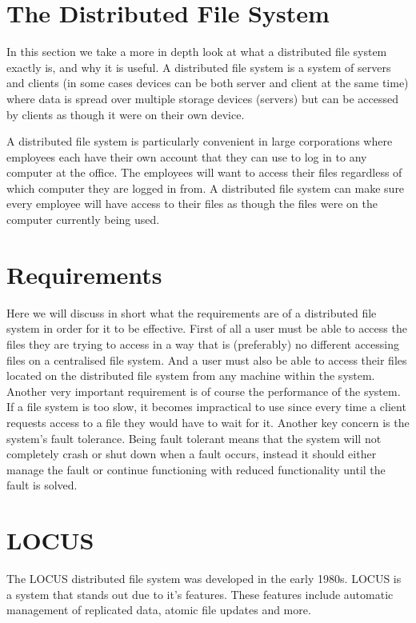 \documentclass[a4paper,12px]{article}
\begin{document}
\section{The Distributed File System}

In this section we take a more in depth look at what a distributed file system
exactly is, and why it is useful. A distributed file system is a system of
servers and clients (in some cases devices can be both server and client at the
same time) where data is spread over multiple storage devices (servers) but can
be accessed by clients as though it were on their own device. \citet{concepts}

A distributed file system is particularly convenient in large corporations where
employees each have their own account that they can use to log in to any
computer at the office. The employees will want to access their files regardless
of which computer they are logged in from. A distributed file system can make
sure every employee will have access to their files as though the files were on
the computer currently being used.

\section{Requirements}

Here we will discuss in short what the requirements are of a distributed file
system in order for it to be effective. First of all a user must be able to
access the files they are trying to access in a way that is (preferably) no
different accessing files on a centralised file system. And a user must also be
able to access their files located on the distributed file system from any
machine within the system. \citet{concepts} Another very important requirement is
of course the performance of the system. If a file system is too slow, it
becomes impractical to use since every time a client requests access to a file
they would have to wait for it. Another key concern is the system's fault
tolerance. Being fault tolerant means that the system will not completely crash
or shut down when a fault occurs, instead it should either manage the fault or
continue functioning with reduced functionality until the fault is
solved. \citet{concepts}

\section{LOCUS}

The LOCUS distributed file system was developed in the early 1980s. LOCUS is a
system that stands out due to it's features. These features include automatic
management of replicated data, atomic file updates and more. \citet{concepts}
\end{document}
